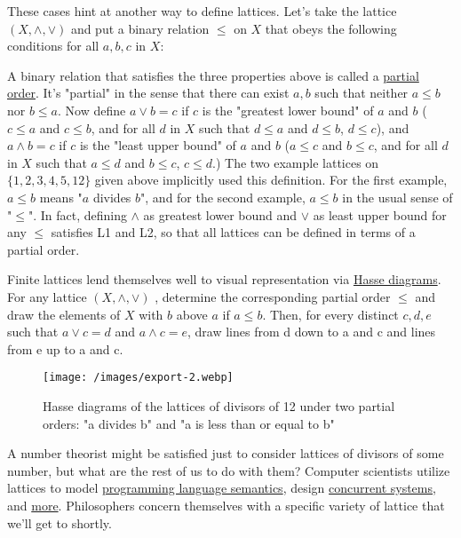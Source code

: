 \documentclass{article}
\begin{document}
These cases hint at another way to define lattices. Let's take the lattice $ (X, \land, \lor)$ and put a binary relation $ \leq$ on $ X$ that obeys the following conditions for all $ a, b, c$ in $ X$:

\begin{itemize}
\item{reflexivity: $ a \leq a$
\item{antisymmetry: $ a \leq b$ and $ b \leq a$ imply $ a = b$}
\item{transitivity: $ a \leq b$ and $ b \leq c$ imply $ a \leq c$}
\end{itemize}

A binary relation that satisfies the three properties above is called a \href{https://en.wikipedia.org/wiki/Partially_ordered_set}{partial order}. It's "partial" in the sense that there can exist $ a, b$ such that neither $ a \leq b$ nor $ b \leq a$. Now define $ a\lor b = c$ if $ c$ is the "greatest lower bound" of $ a$ and $ b$ ($ c \leq a$ and $ c \leq b$, and for all $ d$ in $ X$ such that $ d \leq a$ and $ d \leq b$, $ d \leq c$), and $ a \land b = c$ if $ c$ is the "least upper bound" of $ a$ and $ b$ ($ a \leq c$ and $ b \leq c$, and for all $ d$ in $ X$ such that $ a \leq d$ and $ b \leq c$, $ c \leq d$.) The two example lattices on $ \{1, 2, 3, 4, 5, 12\}$ given above implicitly used this definition. For the first example, $ a \leq b$ means "$ a$ divides $ b$", and for the second example, $ a \leq b$ in the usual sense of "$ \leq $". In fact, defining $ \land $ as greatest lower bound and $ \lor $ as least upper bound for any $ \leq $ satisfies L1 and L2, so that all lattices can be defined in terms of a partial order.

Finite lattices lend themselves well to visual representation via \href{https://en.wikipedia.org/wiki/Hasse_diagram}{Hasse diagrams}. For any lattice $ (X, \land, \lor)$ , determine the corresponding partial order $ \leq $ and draw the elements of $ X$ with $ b$ above $ a$ if $ a \leq b$. Then, for every distinct $ c, d, e$ such that $ a \lor c = d$ and $ a \land c = e$, draw lines from d down to a and c and lines from e up to a and c.

\begin{figure}
\texttt{[image: /images/export-2.webp]}
\caption{Hasse diagrams of the lattices of divisors of 12 under two partial orders: "a divides b" and "a is less than or equal to b"}
\end{figure}

A number theorist might be satisfied just to consider lattices of divisors of some number, but what are the rest of us to do with them? Computer scientists utilize lattices to model \href{https://en.wikipedia.org/wiki/Knaster%E2%80%93Tarski_theorem}{programming language semantics}, design \href{http://www.diva-portal.org/smash/get/diva2:1268459/FULLTEXT01.pdf}{concurrent systems}, and \href{https://cs.stackexchange.com/questions/12493/what-are-lattices-used-for}{more}. Philosophers concern themselves with a specific variety of lattice that we'll get to shortly.
\end{document}
